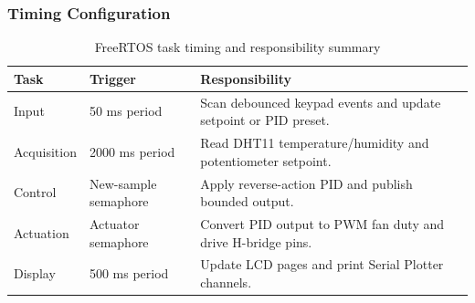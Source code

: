 \subsubsection{Timing Configuration}

\begin{table}[H]
\centering
\begin{tabular}{|p{3.2cm}|p{3.0cm}|p{7.0cm}|}
\hline
\textbf{Task} & \textbf{Trigger} & \textbf{Responsibility} \\
\hline
Input & 50 ms period & Scan debounced keypad events and update setpoint or PID preset. \\
\hline
Acquisition & 2000 ms period & Read DHT11 temperature/humidity and potentiometer setpoint. \\
\hline
Control & New-sample semaphore & Apply reverse-action PID and publish bounded output. \\
\hline
Actuation & Actuator semaphore & Convert PID output to PWM fan duty and drive H-bridge pins. \\
\hline
Display & 500 ms period & Update LCD pages and print Serial Plotter channels. \\
\hline
\end{tabular}
\caption{FreeRTOS task timing and responsibility summary}
\label{tab:task_timing}
\end{table}
